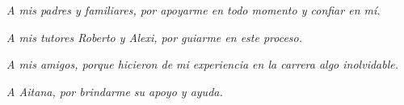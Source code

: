 \begin{dedication}
\textit{A mis padres y familiares, por apoyarme en todo momento y confiar en mí.}

\textit{A mis tutores Roberto y Alexi, por guiarme en este proceso.}

\textit{A mis amigos, porque hicieron de mi experiencia en la carrera algo inolvidable.}

\textit{A Aitana, por brindarme su apoyo y ayuda.}
\end{dedication}